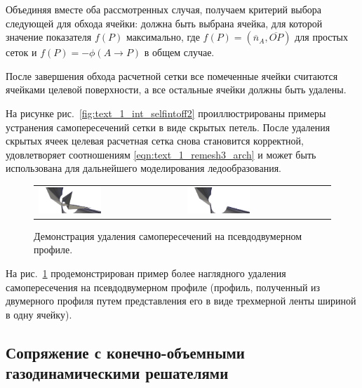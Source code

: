 Объединяя вместе оба рассмотренных случая, получаем критерий выбора следующей для обхода ячейки: должна быть выбрана ячейка, для которой значение показателя $f(P)$ максимально, где $f(P) = (\overline{n}_A, \overline{OP})$ для простых сеток и $f(P) = -\phi(A \rightarrow P)$ в общем случае.

После завершения обхода расчетной сетки все помеченные ячейки считаются ячейками целевой поверхности, а все остальные ячейки должны быть удалены.

На рисунке рис.~\ref{fig:text_1_int_selfintoff2} проиллюстрированы примеры устранения самопересечений сетки в виде скрытых петель.
После удаления скрытых ячеек целевая расчетная сетка снова становится корректной, удовлетворяет соотношениям \eqref{eqn:text_1_remesh3_arch} и может быть использована для дальнейшего моделирования ледообразования.

\begin{figure}[ht]
\centering
\begin{tabular}{ll}
\includegraphics[width=0.45\textwidth]{./pics/text_1_int/2-remesh-before.png}
&
\includegraphics[width=0.45\textwidth]{./pics/text_1_int/2-remesh-after.png} \\
\end{tabular}
\singlespacing
{}\caption{Демонстрация удаления самопересечений на псевдодвумерном профиле.}
\label{fig:text_1_int_self_int_demo2}
\end{figure}

На рис.~\ref{fig:text_1_int_self_int_demo2} продемонстрирован пример более наглядного удаления самопересечения на псевдодвумерном профиле (профиль, полученный из двумерного профиля путем представления его в виде трехмерной ленты шириной в одну ячейку).


\subsection{Сопряжение с конечно-объемными \\ газодинамическими решателями}\label{sec:text_1_gas}

